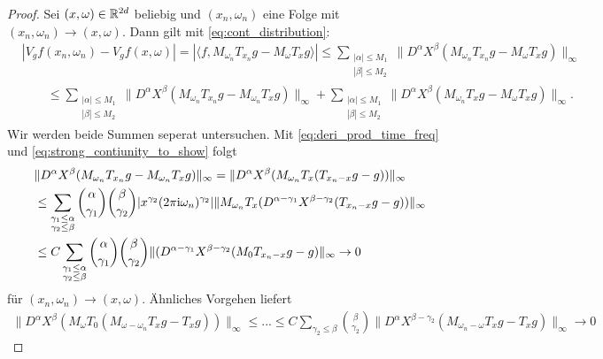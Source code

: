 \begin{proof}
	Sei $ (x,\omega) \in \mathbb{R}^{2d} $ beliebig und $ (x_n, \omega_n)  $ eine Folge mit $ (x_n,\omega_n ) \to (x,\omega) $. Dann gilt mit \eqref{eq:cont_distribution}:
	\begin{align*}
	&|V_g f (x_n,\omega_n) - V_g f(x,\omega)|
	=
	| \langle f, M_{\omega_n} T_{x_n} g - M_\omega T_x g \rangle |
 	\leq
 	\sum 
 	\limits_{
 		\substack{| \alpha | \leq M_1 \\
	 			| \beta | \leq M_2}
 		}
 		\| D^\alpha X^\beta ( M_{\omega_n} T_{x_n} g - M_\omega T_x g) \|_\infty\\
 	&\qquad \leq
 	\sum 
 	\limits_{
 		\substack{| \alpha | \leq M_1 \\
 			| \beta | \leq M_2}
 	}
 	\| D^\alpha X^\beta (M_{\omega_n} T_{x_n} g - M_{\omega_n} T_x g) \|_\infty
 	+
 	\sum 
 	\limits_{
 		\substack{| \alpha | \leq M_1 \\
 			| \beta | \leq M_2}
 	}
 	\| D^\alpha X^\beta (M_{\omega_n} T_{x} g - M_{\omega} T_x g) \|_\infty.
 	\end{align*}
	Wir werden beide Summen seperat untersuchen. Mit \eqref{eq:deri_prod_time_freq} und \eqref{eq:strong_contiunity_to_show} folgt
	\begin{align*}
	&\| D^\alpha X^\beta (M_{\omega_n} T_{x_n} g - M_{\omega_n} T_x g) \|_\infty
	=
	\| D^\alpha X^\beta (M_{\omega_n} T_x (T_{x_n-x} g -  g)) \|_\infty\\
	&\leq
	\sum 
	\limits_{
		\substack{\gamma_1 \leq \alpha
		\\
		\gamma_2 \leq \beta}
		}
		\binom{\alpha}{\gamma_1}
		\binom{\beta}{\gamma_2}
		|x^{\gamma_2}
		(2  \pi \textrm{i} \omega_n)^{\gamma_2}|
		\| M_{\omega_n} T_x(D^{\alpha-\gamma_1} X^{\beta - \gamma_2}
		(T_{x_n-x} g - g)) \|_{\infty}
		\\
	&\leq 
	C
	\sum 
	\limits_{
		\substack{\gamma_1 \leq \alpha
			\\
			\gamma_2 \leq \beta}
	}
	\binom{\alpha}{\gamma_1}
	\binom{\beta}{\gamma_2}
	\| (D^{\alpha-\gamma_1} X^{\beta - \gamma_2}
	(M_0T_{x_n-x} g - g) \|_{\infty}
	\to 0
	\end{align*}
	für $ (x_n,\omega_n ) \to (x,\omega) $.
	Ähnliches Vorgehen liefert
	\begin{align*}
	\| D^\alpha X^\beta (M_{\omega} T_0 ( M_{\omega - \omega_n} T_x g - T_x g)) \|_\infty
	\leq ... 
	\leq
	C 
	\sum \limits_{\gamma_2 \leq \beta}
	\binom{\beta}{\gamma_2}
	\| D^\alpha X^{\beta- \gamma_2}(M_{\omega_n - \omega} T_x g - T_x g) \|_\infty
	\to 0
	\end{align*}

\end{proof}
